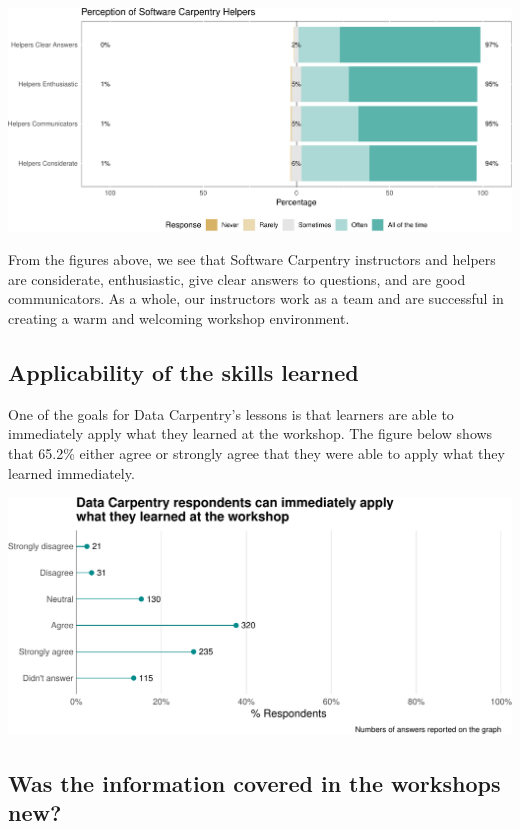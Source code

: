 \documentclass[]{article}
\makeatletter
\def\maxwidth{\ifdim\Gin@nat@width>\linewidth\linewidth\else\Gin@nat@width\fi}
\makeatother
\begin{document}
\includegraphics[width=\maxwidth]{../figures/swc-perception-helpers-1}

From the figures above, we see that Software Carpentry instructors and
helpers are considerate, enthusiastic, give clear answers to questions,
and are good communicators. As a whole, our instructors work as a team
and are successful in creating a warm and welcoming workshop
environment.

\subsection{Applicability of the skills
learned}\label{applicability-of-the-skills-learned}

One of the goals for Data Carpentry's lessons is that learners are able
to immediately apply what they learned at the workshop. The figure below
shows that 65.2\% either agree or strongly agree that they were able to
apply what they learned immediately.

\includegraphics[width=\maxwidth]{../figures/dc-skill-applicability-plot-1}

\subsection{Was the information covered in the workshops
new?}\label{was-the-information-covered-in-the-workshops-new}
\end{document}
